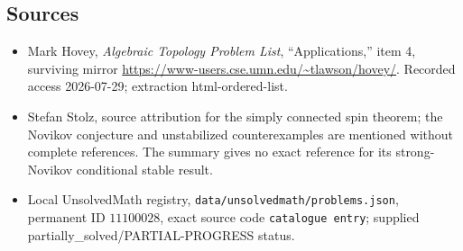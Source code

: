 \documentclass[11pt]{article}
\begin{document}
\subsection{Sources}
\begin{itemize}
\item Mark Hovey, \emph{Algebraic Topology Problem List}, ``Applications,'' item 4, surviving mirror \url{https://www-users.cse.umn.edu/~tlawson/hovey/}. Recorded access 2026-07-29; extraction html-ordered-list.
\item Stefan Stolz, source attribution for the simply connected spin theorem; the Novikov conjecture and unstabilized counterexamples are mentioned without complete references. The summary gives no exact reference for its strong-Novikov conditional stable result.
\item Local UnsolvedMath registry, \texttt{data/unsolvedmath/problems.json}, permanent ID \(11100028\), exact source code \texttt{catalogue entry}; supplied partially\_solved/PARTIAL-PROGRESS status.
\end{itemize}
\end{document}

